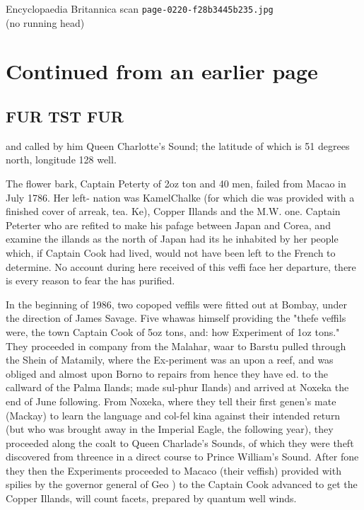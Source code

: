 \documentclass{article}
\begin{document}
\begin{center}
{\Large Encyclopaedia Britannica scan \texttt{page-0220-f28b3445b235.jpg}}\\[0.5em]
(no running head)
\end{center}
\section*{Continued from an earlier page}
\subsection*{FUR TST FUR}
and called by him Queen Charlotte’s Sound; the latitude of which is 51 degrees north, longitude 128 well.

The flower bark, Captain Peterty of 2oz ton and 40 men, failed from Macao in July 1786. Her left- nation was KamelChalke (for which die was provided with a finished cover of arreak, tea. Ke), Copper Illands and the M.W. one. Captain Peterter who are refited to make his pafage between Japan and Corea, and examine the illands as the north of Japan had its he inhabited by her people which, if Captain Cook had lived, would not have been left to the French to determine. No account during here received of this veffi face her departure, there is every reason to fear the has purified.

In the beginning of 1986, two copoped veffils were fitted out at Bombay, under the direction of James Savage. Five whawas himself providing the "thefe veffils were, the town Captain Cook of 5oz tons, and: how Experiment of 1oz tons." They proceeded in company from the Malahar, waar to Barstu pulled through the Shein of Matamily, where the Ex-periment was an upon a reef, and was obliged and almost upon Borno to repairs from hence they have ed. to the callward of the Palma Ilands; made sul-phur Ilands) and arrived at Noxeka the end of June following. From Noxeka, where they tell their first genen's mate (Mackay) to learn the language and col-fel kina against their intended return (but who was brought away in the Imperial Eagle, the following year), they proceeded along the coalt to Queen Charlade's Sounds, of which they were theft discovered from threence in a direct course to Prince William's Sound. After fone they then the Experiments proceeded to Macaco (their veffish) provided with spilies by the governor general of Geo ) to the Captain Cook advanced to get the Copper Illands, will count facets, prepared by quantum well winds.
\end{document}
